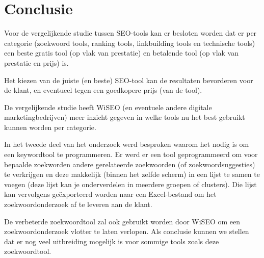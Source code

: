 \chapter{Conclusie}
\label{ch:conclusie}

Voor de vergelijkende studie tussen SEO-tools kan er besloten worden dat er per categorie (zoekwoord tools, ranking tools, linkbuilding tools en technische tools) een beste gratis tool (op vlak van prestatie) en betalende tool (op vlak van prestatie en prijs) is.

Het kiezen van de juiste (en beste) SEO-tool kan de resultaten bevorderen voor de klant, en eventueel tegen een goedkopere prijs (van de tool). 

De vergelijkende studie heeft WiSEO (en eventuele andere digitale marketingbedrijven) meer inzicht gegeven in welke tools nu het best gebruikt kunnen worden per categorie. 

In het tweede deel van het onderzoek werd besproken waarom het nodig is om een keywordtool te programmeren. Er werd er een tool geprogrammeerd om voor bepaalde zoekworden andere gerelateerde zoekwoorden (of zoekwoordsuggesties) te verkrijgen en deze makkelijk (binnen het zelfde scherm) in een lijst te samen te voegen (deze lijst kan je onderverdelen in meerdere groepen of clusters). Die
lijst kan vervolgens geëxporteerd worden naar een Excel-bestand om het zoekwoordonderzoek af te leveren aan de klant.

De verbeterde zoekwoordtool zal ook gebruikt worden door WiSEO om een zoekwoordonderzoek vlotter te laten verlopen. Als conclusie kunnen we stellen dat er nog veel uitbreiding mogelijk is voor sommige tools zoals deze zoekwoordtool. 